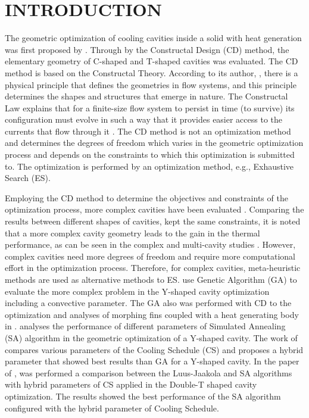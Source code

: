 \documentclass[12pt,fleqn]{article}
\begin{document}
\pagestyle{fancy}

\section{INTRODUCTION}
The geometric optimization of cooling cavities inside a solid with heat generation was first proposed by \cite{Biserni2004}. Through by the Constructal Design (CD) method, the elementary geometry of C-shaped and T-shaped cavities was evaluated. The CD method is based on the Constructal Theory. According to its author, \citep{Bejan}, there is a physical principle that defines the geometries in flow systems, and this principle determines the shapes and structures that emerge in nature. The Constructal Law explains that for a finite-size flow system to persist in time (to survive) its configuration must evolve in such a way that it provides easier access to the currents that flow through it \citep{Bejan}. The CD method is not an optimization method and determines the degrees of freedom which varies in the geometric optimization process and depends on the constraints to which this optimization is submitted to. The optimization is performed by an optimization method, e.g., Exhaustive Search (ES).

Employing the CD method to determine the objectives and constraints of the optimization process, more complex cavities have been evaluated \citep{Biserni2007}. Comparing the results between different shapes of cavities, kept the same constraints, it is noted that a more complex cavity geometry leads to the gain in the thermal performance, as can be seen in the complex and multi-cavity studies \citep{Lorenzini2012,Xie2010}. However, complex cavities need more degrees of freedom and require more computational effort in the optimization process. Therefore, for complex cavities, meta-heuristic methods are used as alternative methods to ES. \cite{Lorenzini2014} use Genetic Algorithm (GA) to evaluate the more complex problem in the Y-shaped cavity optimization including a convective parameter. The GA also was performed with CD to the optimization and analyses of morphing fins coupled with a heat generating body in \cite{Biserni2017}. \cite{Gonzales2015} analyses the performance of different parameters of Simulated Annealing (SA) algorithm in the geometric optimization of a Y-shaped cavity. The work of \cite{Gonzales2015} compares various parameters of the Cooling Schedule (CS) and proposes a hybrid parameter that showed best results than GA for a Y-shaped cavity. In the paper of \cite{Gonzales2017}, was performed a comparison between the Luus-Jaakola and SA algorithms with hybrid parameters of CS applied in the Double-T shaped cavity optimization. The results showed the best performance of the SA algorithm configured with the hybrid parameter of Cooling Schedule.
\end{document}
